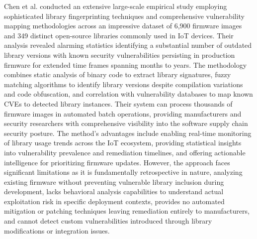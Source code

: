 Chen et al. \cite{chen2024autofirm} conducted an extensive large-scale empirical study employing sophisticated library fingerprinting techniques and comprehensive vulnerability mapping methodologies across an impressive dataset of 6,900 firmware images and 349 distinct open-source libraries commonly used in IoT devices. Their analysis revealed alarming statistics identifying a substantial number of outdated library versions with known security vulnerabilities persisting in production firmware for extended time frames spanning months to years. The methodology combines static analysis of binary code to extract library signatures, fuzzy matching algorithms to identify library versions despite compilation variations and code obfuscation, and correlation with vulnerability databases to map known CVEs to detected library instances. Their system can process thousands of firmware images in automated batch operations, providing manufacturers and security researchers with comprehensive visibility into the software supply chain security posture. The method's advantages include enabling real-time monitoring of library usage trends across the IoT ecosystem, providing statistical insights into vulnerability prevalence and remediation timelines, and offering actionable intelligence for prioritizing firmware updates. However, the approach faces significant limitations as it is fundamentally retrospective in nature, analyzing existing firmware without preventing vulnerable library inclusion during development, lacks behavioral analysis capabilities to understand actual exploitation risk in specific deployment contexts, provides no automated mitigation or patching techniques leaving remediation entirely to manufacturers, and cannot detect custom vulnerabilities introduced through library modifications or integration issues.

